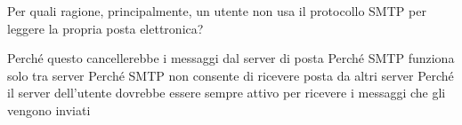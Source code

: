 \question
Per quali ragione, principalmente, un utente non usa il protocollo SMTP per leggere la propria posta elettronica?

\begin{checkboxes}
	\choice Perché questo cancellerebbe i messaggi dal server di posta
	\choice Perché SMTP funziona solo tra server
	\choice Perché SMTP non consente di ricevere posta da altri server
	\CorrectChoice Perché il server dell'utente dovrebbe essere sempre attivo per ricevere i messaggi che gli vengono inviati
\end{checkboxes}
